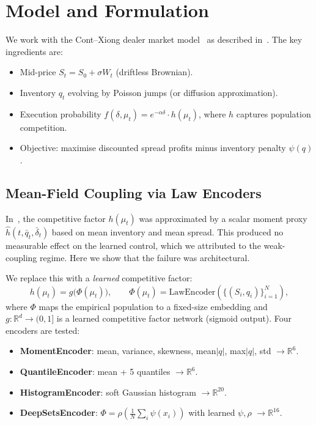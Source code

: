 \documentclass[11pt,a4paper]{article}
\newcommand{\R}{\mathbb{R}}
\newcommand{\mup}{\mu_t}
\begin{document}
\section{Model and Formulation}
\label{sec:model}

We work with the Cont--Xiong dealer market model~\cite{cont2024dynamics} as described in~\cite{garry2026preprint1}. The key ingredients are:
\begin{itemize}
  \item Mid-price $S_t = S_0 + \sigma W_t$ (driftless Brownian).
  \item Inventory $q_t$ evolving by Poisson jumps (or diffusion approximation).
  \item Execution probability $f(\delta, \mup) = e^{-\alpha\delta} \cdot h(\mup)$, where $h$ captures population competition.
  \item Objective: maximise discounted spread profits minus inventory penalty $\psi(q)$.
\end{itemize}

\subsection{Mean-Field Coupling via Law Encoders}

In~\cite{garry2026preprint1}, the competitive factor $h(\mup)$ was approximated by a scalar moment proxy $\hat{h}(t, \bar{q}_t, \bar{\delta}_t)$ based on mean inventory and mean spread. This produced no measurable effect on the learned control, which we attributed to the weak-coupling regime. Here we show that the failure was architectural.

We replace this with a \emph{learned} competitive factor:
\begin{equation}\label{eq:h_law}
  h(\mup) = g\bigl(\Phi(\mup)\bigr), \qquad \Phi(\mup) = \text{LawEncoder}(\{(S_i, q_i)\}_{i=1}^N),
\end{equation}
where $\Phi$ maps the empirical population to a fixed-size embedding and $g: \R^d \to (0, 1]$ is a learned competitive factor network (sigmoid output). Four encoders are tested:
\begin{itemize}
  \item \textbf{MomentEncoder}: mean, variance, skewness, mean$|q|$, max$|q|$, std $\to \R^6$.
  \item \textbf{QuantileEncoder}: mean + 5 quantiles $\to \R^6$.
  \item \textbf{HistogramEncoder}: soft Gaussian histogram $\to \R^{20}$.
  \item \textbf{DeepSetsEncoder}: $\Phi = \rho(\frac{1}{N}\sum_i \psi(x_i))$ with learned $\psi, \rho$ $\to \R^{16}$.
\end{itemize}
\end{document}
